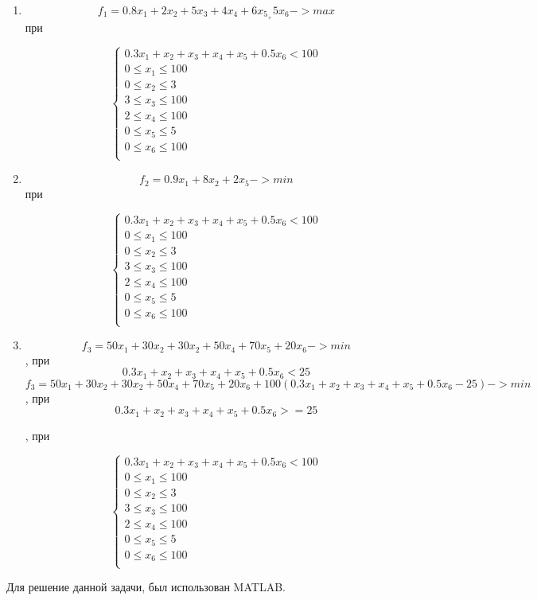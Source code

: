 \documentclass[14pt,a4paper,report]{report}
\begin{document}
\begin{enumerate}

     \item $$ f_1 = 0.8x_1+2x_2+5x_3+4x_4+6x_5_+5x_6 -> max$$
 при

\begin{equation*}
 \begin{cases}
     0.3x_1+x_2+x_3+x_4+x_5+0.5x_6 < 100  \\
     0 \leq x_1 \leq 100  \\
     0 \leq x_2 \leq 3   \\
     3 \leq x_3 \leq 100   \\
     2 \leq x_4 \leq 100   \\
     0 \leq x_5 \leq 5  \\
     0 \leq x_6 \leq 100   \\
 \end{cases}
\end{equation*}

     \item $$ f_2 = 0.9x_1+8x_2+2x_5 -> min$$
при

\begin{equation*}
 \begin{cases}
     0.3x_1+x_2+x_3+x_4+x_5+0.5x_6 < 100  \\
     0 \leq x_1 \leq 100  \\
     0 \leq x_2 \leq 3   \\
     3 \leq x_3 \leq 100   \\
     2 \leq x_4 \leq 100   \\
     0 \leq x_5 \leq 5  \\
     0 \leq x_6 \leq 100   \\
 \end{cases}
\end{equation*}

     \item  $$ f_3 = 50x_1+30x_2+30x_2+50x_4+70x_5+20x_6 -> min $$ , при $$0.3x_1+x_2+x_3+x_4+x_5+0.5x_6<25$$
 $$f_3 = 50x_1+30x_2+30x_2+50x_4+70x_5+20x_6 + 100(0.3x_1+x_2+x_3+x_4+x_5+0.5x_6-25)->min $$, при $$0.3x_1+x_2+x_3+x_4+x_5+0.5x_6>=25$$
 
, при

\begin{equation*}
 \begin{cases}
     0.3x_1+x_2+x_3+x_4+x_5+0.5x_6 < 100  \\
     0 \leq x_1 \leq 100  \\
     0 \leq x_2 \leq 3   \\
     3 \leq x_3 \leq 100   \\
     2 \leq x_4 \leq 100   \\
     0 \leq x_5 \leq 5  \\
     0 \leq x_6 \leq 100   \\
 \end{cases}
\end{equation*}
\end{enumerate}
Для решение данной задачи, был использован MATLAB.
\end{document}
